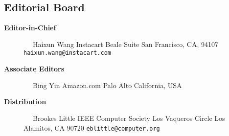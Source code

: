 \documentclass[10pt,twocolumn]{article}
\begin{document}
\pagestyle{empty}

\subsection*{Editorial Board}

\begin{description}
\item[{\bf Editor-in-Chief}]
\verb-  -                      \newline
Haixun Wang                 \newline
Instacart              Beale Suite\newline
San Francisco, CA, 94107\newline
\verb+haixun.wang@instacart.com+     \newline
\vspace{-.2cm}

\item[{\bf Associate Editors}] 
\verb-  -                     \newline
Bing Yin\newline
Amazon.com\newline
Palo Alto\newline
California, USA\newline

\item[{\bf Distribution}]      
\verb-  -                      \newline
Brookes Little           \newline
IEEE Computer Society           Los Vaqueros Circle       \newline
Los Alamitos, CA 90720     \newline
\verb+eblittle@computer.org+     \newline
\vspace{-.4cm}		            
\end{description}

\end{document}
